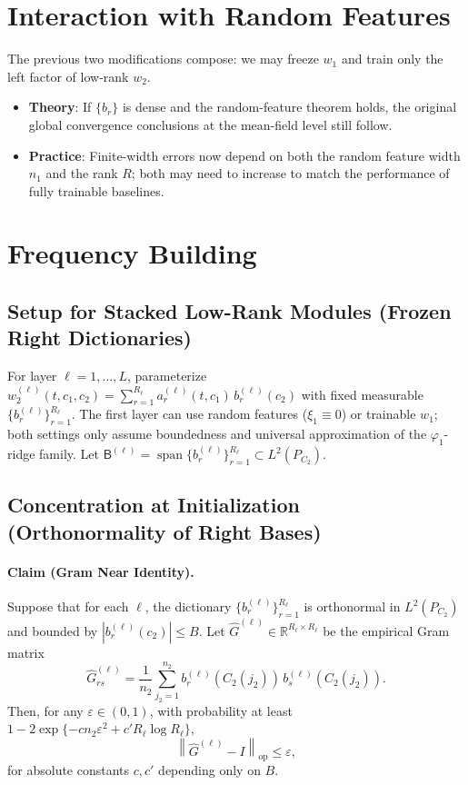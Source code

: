 \documentclass{article}
\begin{document}
\section{Interaction with Random Features}

The previous two modifications compose: we may freeze $w_1$ and train only the left factor of low-rank $w_2$.

\begin{itemize}[leftmargin=1.5em]
    \item \textbf{Theory}: If $\{b_r\}$ is dense and the random-feature theorem holds, the original global convergence conclusions at the mean-field level still follow.
    \item \textbf{Practice}: Finite-width errors now depend on both the random feature width $n_1$ and the rank $R$; both may need to increase to match the performance of fully trainable baselines.
\end{itemize}

\section{Frequency Building}

\subsection{Setup for Stacked Low-Rank Modules (Frozen Right Dictionaries)}

For layer $\ell=1,\ldots, L$, parameterize $w_2^{(\ell)}(t, c_1, c_2)=\sum_{r=1}^{R_\ell} a_r^{(\ell)}(t, c_1)\, b_r^{(\ell)}(c_2)$ with fixed measurable $\{b_r^{(\ell)}\}_{r=1}^{R_\ell}$. The first layer can use random features ($\xi_1\equiv 0$) or trainable $w_1$; both settings only assume boundedness and universal approximation of the $\varphi_1$-ridge family. Let $\mathsf{B}^{(\ell)} = \operatorname{span} \{b_r^{(\ell)}\}_{r=1}^{R_\ell} \subset L^2(P_{C_2})$.

\subsection{Concentration at Initialization (Orthonormality of Right Bases)}

\paragraph{Claim (Gram Near Identity).}
Suppose that for each $\ell$, the dictionary $\{b_r^{(\ell)}\}_{r=1}^{R_\ell}$ is orthonormal in $L^2(P_{C_2})$ and bounded by $|b_r^{(\ell)}(c_2)| \leq B$. Let $\widehat{G}^{(\ell)} \in \mathbb{R}^{R_\ell \times R_\ell}$ be the empirical Gram matrix
\[
    \widehat{G}^{(\ell)}_{rs} = \frac{1}{n_2} \sum_{j_2=1}^{n_2} b_r^{(\ell)}(C_2(j_2))\,b_s^{(\ell)}(C_2(j_2)).
\]
Then, for any $\varepsilon \in (0,1)$, with probability at least $1 - 2\exp\{-c n_2 \varepsilon^2 + c' R_\ell \log R_\ell\}$,
\[
    \left\| \widehat{G}^{(\ell)} - I \right\|_{\mathrm{op}} \leq \varepsilon,
\]
for absolute constants $c, c'$ depending only on $B$.
\end{document}
